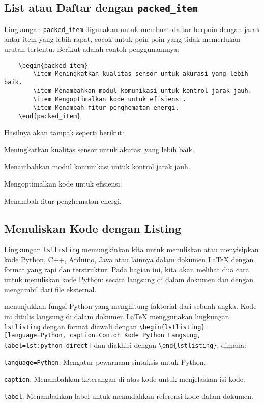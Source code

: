 \subsection{List atau Daftar dengan \texttt{packed\_item}}
Lingkungan \texttt{packed\_item} digunakan untuk membuat daftar berpoin dengan jarak antar item yang lebih rapat, cocok untuk poin-poin yang tidak memerlukan urutan tertentu. Berikut adalah contoh penggunaannya:

\begin{lstlisting}
    \begin{packed_item}
        \item Meningkatkan kualitas sensor untuk akurasi yang lebih baik.
        \item Menambahkan modul komunikasi untuk kontrol jarak jauh.
        \item Mengoptimalkan kode untuk efisiensi.
        \item Menambah fitur penghematan energi.
    \end{packed_item}
\end{lstlisting}

Hasilnya akan tampak seperti berikut:
\begin{packed_item}
    \item Meningkatkan kualitas sensor untuk akurasi yang lebih baik.
    \item Menambahkan modul komunikasi untuk kontrol jarak jauh.
    \item Mengoptimalkan kode untuk efisiensi.
    \item Menambah fitur penghematan energi.
\end{packed_item}

\subsection{Menuliskan Kode dengan Listing}
Lingkungan \texttt{lstlisting} memungkinkan kita untuk menuliskan atau menyisipkan kode Python, C++, Arduino, Java atau lainnya dalam dokumen LaTeX dengan format yang rapi dan terstruktur. Pada bagian ini, kita akan melihat dua cara untuk menuliskan kode Python: secara langsung di dalam dokumen dan dengan mengambil dari file eksternal.

 menunjukkan fungsi Python yang menghitung faktorial dari sebuah angka. Kode ini ditulis langsung di dalam dokumen LaTeX menggunakan lingkungan \texttt{lstlisting} dengan format diawali dengan \texttt{\textbackslash begin\{lstlisting\}[language=Python, caption=Contoh Kode Python Langsung, label=lst:python\_direct]} dan diakhiri dengan \texttt{\textbackslash end\{lstlisting\}}, dimana:
\begin{packed_item}
    \item \texttt{language=Python}: Mengatur pewarnaan sintaksis untuk Python.
    \item \texttt{caption}: Menambahkan keterangan di atas kode untuk menjelaskan isi kode.
    \item \texttt{label}: Menambahkan label untuk memudahkan referensi kode dalam dokumen.
\end{packed_item}

